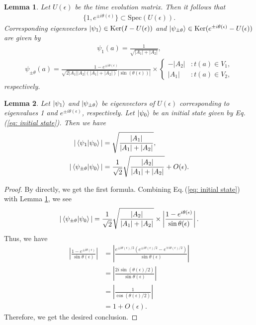 \documentclass[10pt,a4paper]{amsart}
\newtheorem{lemma}{Lemma}
\begin{document}
\begin{lemma}
    \label{lem: eigenpair of U}
    Let $U(\epsilon)$ be the time evolution matrix. Then it follows that
    \begin{align*}
        \{1, e^{\pm i \theta(\epsilon)}\} \subset \mathrm{Spec}(U(\epsilon)).
    \end{align*}
    Corresponding eigenvectors $\ket{\psi_1} \in \mathrm{Ker}(I-U(\epsilon))$ and $\ket{\psi_{\pm\theta}} \in \mathrm{Ker}(e^{\pm i\theta(\epsilon)}-U(\epsilon))$ are given by
    \begin{align*}
        \psi_1(a)=\frac{1}{\sqrt{|A_1|+|A_2|}},
    \end{align*} 
    \begin{align*}
        \psi_{\pm\theta}(a)=\frac{1-e^{\pm i\theta(\epsilon)}}{\sqrt{2|A_1||A_2|(|A_1|+|A_2|)}\,|\sin (\theta(\epsilon))|}\times
        \begin{cases}
            -|A_2| &: t(a) \in V_1, \\
            |A_1| &: t(a) \in V_2,
        \end{cases}
    \end{align*}
    respectively.
\end{lemma}

\begin{lemma}
\label{lem: overlap}
Let $\ket{\psi_1}$ and $\ket{\psi_{\pm \theta}}$ be eigenvectors of $U(\epsilon)$ corresponding to eigenvalues 1 and $e^{\pm i\theta(\epsilon)}$, respectively.
Let $\ket{\psi_0}$ be an initial state given by Eq. (\ref{eq: initial state}). Then we have
    \begin{align*}
        |\braket{\psi_1|\psi_0}|&=\sqrt{\frac{|A_1|}{|A_1|+|A_2|}}, \\
        |\braket{\psi_{\pm\theta}|\psi_0}|&=\frac{1}{\sqrt{2}}\sqrt{\frac{|A_2|}{|A_1|+|A_2|}}+O(\epsilon).
    \end{align*}
\end{lemma}

\begin{proof}
    By directly, we get the first formula. Combining Eq.\,(\ref{eq: initial state}) with Lemma \ref{lem: eigenpair of U}, we see
    \begin{align*}
        |\braket{\psi_{\pm \theta}|\psi_0}|=\frac{1}{\sqrt{2}}\sqrt{\frac{|A_2|}{|A_1|+|A_2|}}\times \left| \frac{1-e^{i\theta(\epsilon)}}{\sin \theta(\epsilon)}\right|.
    \end{align*}
    Thus, we have
    \begin{align*}
        \left| \frac{1-e^{\pm i\theta(\epsilon)}}{\sin \theta(\epsilon)}\right|
        &= \left|\frac{e^{\pm i\theta(\epsilon)/2}(e^{\pm i \theta(\epsilon)/2}-e^{\mp i \theta(\epsilon)/2})}{\sin \theta(\epsilon)} \right| \\
        &= \left|\frac{2i \sin (\theta(\epsilon)/2)}{\sin \theta(\epsilon)}\right| \\
        &= \left|\frac{1}{\cos (\theta(\epsilon)/2)} \right| \\
        &= 1+O(\epsilon).
    \end{align*}
    Therefore, we get the desired conclusion.
\end{proof}
\end{document}
